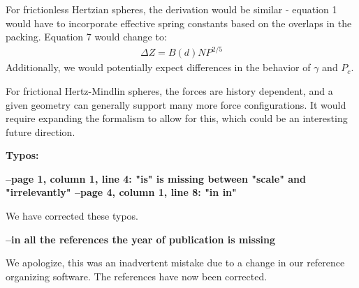 \documentclass[a4paper,11pt]{article}
\begin{document}
For frictionless Hertzian spheres, the derivation would be similar - equation 1 would have to incorporate effective spring constants based on the overlaps in the packing. Equation 7 would change to: 
\begin{align*}
\Delta Z = B(d) N P^{2/5}
\end{align*}
Additionally, we would potentially expect differences in the behavior of $\gamma$ and $P_c$. 

For frictional Hertz-Mindlin spheres, the forces are history dependent, and a given geometry can generally support many more force configurations. It would require expanding the formalism to allow for this, which could be an interesting future direction. 

\vskip 0.5cm
\textbf{Typos:}

\textbf{--page 1, column 1, line 4: "is" is missing between "scale" and "irrelevantly"
--page 4, column 1, line 8: "in in"}
\vskip 0.3cm

We have corrected these typos.

\vskip 0.3cm
\textbf{--in all the references the year of publication is missing}
\vskip 0.3cm

We apologize, this was an inadvertent mistake due to a change in our reference organizing software. The references have now been corrected.

\vskip 2.0cm
\end{document}
